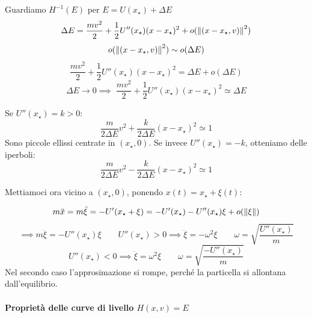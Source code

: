 Guardiamo $H^{-1}(E)$ per $E = U(x_\star) + \Delta E$
\begin{equation}
    \Delta E = \frac{mv^2}{2} + \frac{1}{2} U''(x_\star)(x - x_\star)^2 + o(\norm{(x - x_\star, v)}^2)
\end{equation}
\begin{equation}
    o(\norm{(x - x_\star, v)}^2) \sim o(\Delta E)
\end{equation}
\begin{equation*}
    \frac{mv^2}{2} + \frac{1}{2} U''(x_\star)(x - x_\star)^2 = \Delta E + o(\Delta E)
\end{equation*}
\begin{equation}
    \Delta E \to 0\implies \;\frac{mv^2}{2} + \frac{1}{2} U''(x_\star)(x - x_\star)^2 \simeq \Delta E
\end{equation}

Se $U''(x_\star)= k>0$:
\begin{equation}
    \frac{m}{2\Delta E}v^2 + \frac{k}{2\Delta E}(x - x_\star)^2 \simeq 1
\end{equation}
Sono piccole ellissi centrate in $(x_\star, 0)$. Se invece $U''(x_\star) = -k$, otteniamo delle iperboli:
\begin{equation}
    \frac{m}{2\Delta E}v^2 - \frac{k}{2\Delta E}(x - x_\star)^2 \simeq 1
\end{equation}


Mettiamoci ora vicino a $(x_\star,0)$, ponendo $x(t)= x_\star + \xi(t)$:

\begin{equation}
    m \ddot{x} = m \ddot{\xi} = -U'(x_\star + \xi) = -U'(x_\star) - U''(x_\star)\xi + o(\norm{\xi})
\end{equation}
\begin{equation}
    \implies m \ddot{\xi} = - U''(x_\star)\xi
    \qquad U''(x_\star) > 0 \implies \ddot{\xi} = - \omega^2 \xi \qquad \omega = \sqrt{\frac{U''(x_\star)}{m}}
\end{equation}
\begin{equation}
    U''(x_\star) < 0 \implies \ddot{\xi} = \omega^2 \xi \qquad \omega = \sqrt{\frac{-U''(x_\star)}{m}}
\end{equation}
Nel secondo caso l'approsimazione si rompe, perché la particella si allontana dall'equilibrio.

\paragraph{Proprietà delle curve di livello $H(x,v)=E$}

